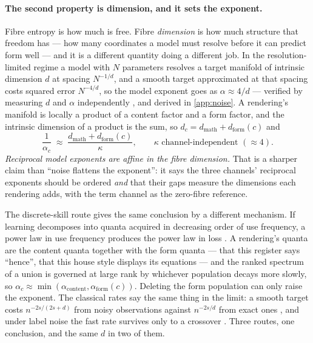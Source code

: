 \paragraph{The second property is dimension, and it sets the exponent.}
Fibre entropy is how much is free.
Fibre \emph{dimension} is how much structure that freedom has --- how many
coordinates a model must resolve before it can predict form well --- and it is a
different quantity doing a different job.
In the resolution-limited regime \citep{bahri2024explaining} a model with \(N\)
parameters resolves a target manifold of intrinsic dimension \(d\) at spacing
\(N^{-1/d}\), and a smooth target approximated at that spacing costs squared
error \(N^{-4/d}\), so the model exponent goes as \(\alpha \approx 4/d\) ---
verified by measuring \(d\) and \(\alpha\) independently
\citep{sharma2022manifold}, and derived in \cref{app:noise}.
A rendering's manifold is locally a product of a content factor and a form
factor, and the intrinsic dimension of a product is the sum, so
\(d_c = d_{\mathrm{math}} + d_{\mathrm{form}}(c)\) and
\begin{equation}
\label{eq:alphafibre}
  \frac{1}{\alpha_c}
  \;\approx\; \frac{d_{\mathrm{math}} + d_{\mathrm{form}}(c)}{\kappa},
  \qquad \kappa \text{ channel-independent } (\approx 4).
\end{equation}
\emph{Reciprocal model exponents are affine in the fibre dimension.}
That is a sharper claim than ``noise flattens the exponent'':
it says the three channels' reciprocal exponents should be ordered \emph{and}
that their gaps measure the dimensions each rendering adds, with the term
channel as the zero-fibre reference.

The discrete-skill route gives the same conclusion by a different mechanism.
If learning decomposes into quanta acquired in decreasing order of use
frequency, a power law in use frequency produces the power law in loss
\citep{michaud2023quantization}.
A rendering's quanta are the content quanta together with the form quanta ---
that this register says ``hence'', that this house style displays its
equations --- and the ranked spectrum of a union is governed at large rank by
whichever population decays more slowly, so
\(\alpha_c \approx \min(\alpha_{\mathrm{content}}, \alpha_{\mathrm{form}}(c))\).
Deleting the form population can only raise the exponent.
The classical rates say the same thing in the limit:
a smooth target costs \(n^{-2s/(2s+d)}\) from noisy observations against
\(n^{-2s/d}\) from exact ones \citep{stone1982optimalrates,
tsybakov2009nonparametric}, and under label noise the fast rate survives only to
a crossover \citep{cui2021noisycrossover}.
Three routes, one conclusion, and the same \(d\) in two of them.

